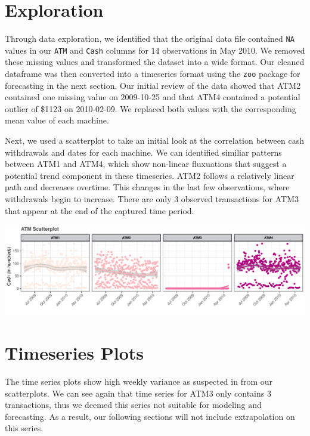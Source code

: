 \documentclass[openany]{book}
\begin{document}
\hypertarget{exploration}{%
\section{Exploration}\label{exploration}}

Through data exploration, we identified that the original data file
contained \texttt{NA} values in our \texttt{ATM} and \texttt{Cash}
columns for 14 observations in May 2010. We removed these missing values
and transformed the dataset into a wide format. Our cleaned dataframe
was then converted into a timeseries format using the \texttt{zoo}
package for forecasting in the next section. Our initial review of the
data showed that ATM2 contained one missing value on 2009-10-25 and that
ATM4 contained a potential outlier of \$1123 on 2010-02-09. We replaced
both values with the corresponding mean value of each machine.

Next, we used a scatterplot to take an initial look at the correlation
between cash withdrawals and dates for each machine. We can identified
similiar patterns between ATM1 and ATM4, which show non-linear
fluxuations that suggest a potential trend component in these
timeseries. ATM2 follows a relatively linear path and decreases
overtime. This changes in the last few observations, where withdrawals
begin to increase. There are only 3 observed transactions for ATM3 that
appear at the end of the captured time period.

\includegraphics{Part-A-JM_files/figure-latex/unnamed-chunk-2-1.pdf}

\hypertarget{timeseries-plots}{%
\section{Timeseries Plots}\label{timeseries-plots}}

The time series plots show high weekly variance as suspected in from our
scatterplots. We can see again that time series for ATM3 only contains 3
transactions, thus we deemed this series not suitable for modeling and
forecasting. As a result, our following sections will not include
extrapolation on this series.
\end{document}
